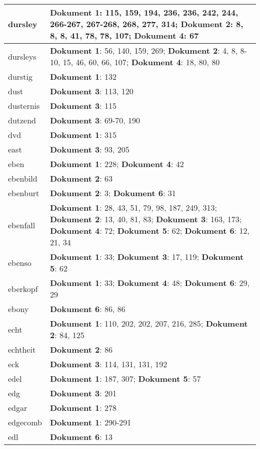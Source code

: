 \documentclass[a5paper]{article}
\begin{document}
\begin{longtable}[l]{|l|p{3in}|}
\hline
dursley & \textbf{Dokument 1}: 115, 159, 194, 236, 236, 242, 244, 266-267, 267-268, 268, 277, 314; \textbf{Dokument 2}: 8, 8, 8, 41, 78, 78, 107; \textbf{Dokument 4}: 67 \\
\hline
dursleys & \textbf{Dokument 1}: 56, 140, 159, 269; \textbf{Dokument 2}: 4, 8, 8-10, 15, 46, 60, 66, 107; \textbf{Dokument 4}: 18, 80, 80 \\
\hline
durstig & \textbf{Dokument 1}: 132 \\
\hline
dust & \textbf{Dokument 3}: 113, 120 \\
\hline
dusternis & \textbf{Dokument 3}: 115 \\
\hline
dutzend & \textbf{Dokument 3}: 69-70, 190 \\
\hline
dvd & \textbf{Dokument 1}: 315 \\
\hline
east & \textbf{Dokument 3}: 93, 205 \\
\hline
eben & \textbf{Dokument 1}: 228; \textbf{Dokument 4}: 42 \\
\hline
ebenbild & \textbf{Dokument 2}: 63 \\
\hline
ebenburt & \textbf{Dokument 2}: 3; \textbf{Dokument 6}: 31 \\
\hline
ebenfall & \textbf{Dokument 1}: 28, 43, 51, 79, 98, 187, 249, 313; \textbf{Dokument 2}: 13, 40, 81, 83; \textbf{Dokument 3}: 163, 173; \textbf{Dokument 4}: 72; \textbf{Dokument 5}: 62; \textbf{Dokument 6}: 12, 21, 34 \\
\hline
ebenso & \textbf{Dokument 1}: 33; \textbf{Dokument 3}: 17, 119; \textbf{Dokument 5}: 62 \\
\hline
eberkopf & \textbf{Dokument 1}: 33; \textbf{Dokument 4}: 48; \textbf{Dokument 6}: 29, 29 \\
\hline
ebony & \textbf{Dokument 6}: 86, 86 \\
\hline
echt & \textbf{Dokument 1}: 110, 202, 202, 207, 216, 285; \textbf{Dokument 2}: 84, 125 \\
\hline
echtheit & \textbf{Dokument 2}: 86 \\
\hline
eck & \textbf{Dokument 3}: 114, 131, 131, 192 \\
\hline
edel & \textbf{Dokument 1}: 187, 307; \textbf{Dokument 5}: 57 \\
\hline
edg & \textbf{Dokument 3}: 201 \\
\hline
edgar & \textbf{Dokument 1}: 278 \\
\hline
edgecomb & \textbf{Dokument 1}: 290-291 \\
\hline
edl & \textbf{Dokument 6}: 13 \\

\end{longtable}
\end{document}
